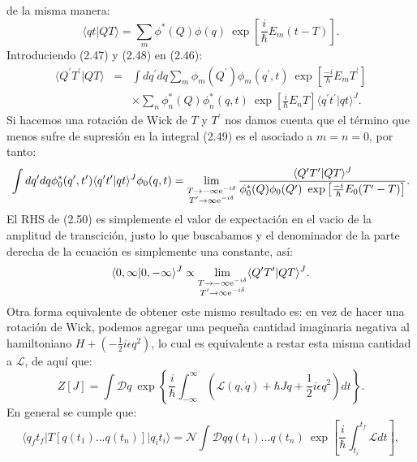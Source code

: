 de la misma manera:
\begin{equation}
\langle qt|	QT  \rangle=\sum_{m}\phi^{*}(Q)\phi(q)\ \exp\left[\frac{i}{\hbar}E_{m}(t-T)\right].
\end{equation}
Introduciendo (2.47) y (2.48) en (2.46):
\begin{eqnarray}
\nonumber \langle Q^{\prime} T^{\prime}|QT\rangle &=&\int dq^{\prime} dq\sum_{m}\phi_{m}(Q^{\prime})\phi_{m}(q^{\prime},t)\ \exp\left[\frac{-i}{\hbar}E_{m}T^{\prime}\right]\\
&&\times  \sum_{n}\phi_{n}^{*}(Q)\phi_{n}^{*}(q,t)\ \exp\left[\frac{i}{\hbar}E_{n}T\right]\langle q^{\prime} t^{\prime}|qt\rangle^{J}.
\end{eqnarray}
Si hacemos una rotación de Wick de $T$ y $T^{\prime} $ nos damos cuenta que el término que menos sufre de supresión en la integral (2.49) es el asociado a $m=n=0$, por tanto:
\begin{equation}
\int dq^{\prime} dq\phi_{0}^{*}(q^{\prime},t^{\prime})\langle q^{\prime} t^{\prime}|qt\rangle^{J}\phi_{0}(q,t)=\lim_{\substack{T\to-\text{\ensuremath{\infty}e}^{-i\delta}\\T^{\prime}\to\text{\ensuremath{\infty}e}^{-i\delta}}}\frac{\langle Q^{\prime} T^{\prime}|QT\rangle^{J}}{\phi_{0}^{*}(Q)\phi_{0}(Q^{\prime})\ \exp\left[\frac{-i}{\hbar}E_{0}(T^{\prime}-T)\right]}.
\end{equation}
El RHS de (2.50) es simplemente el valor de expectación en el vacio de la amplitud de transcición, justo lo que buscabamos y el denominador de la parte derecha de la ecuación es simplemente una constante, así:
\begin{equation}
\langle 0,\infty| 0,-\infty \rangle ^J \propto \lim_{\substack{T\to-\text{\ensuremath{\infty}e}^{-i\delta}\\T^{\prime}\to\text{\ensuremath{\infty}e}^{-i\delta}}} \langle Q^{\prime} T^{\prime}|QT\rangle^{J}.
\end{equation}
Otra forma equivalente de obtener este mismo resultado es: en vez de hacer una rotación de Wick, podemos agregar una pequeña cantidad imaginaria negativa al hamiltoniano $H+(-\frac{1}{2}i\epsilon q^2)$, lo cual es equivalente a restar esta misma cantidad a $\mathcal{L}$, de aquí que:
\begin{equation}
Z[J]=\int\mathcal{D}q\ \exp\left\{ \frac{i}{\hbar}\int_{-\infty}^{\infty}(\mathcal{L}(q,\dot{q})+\hbar Jq + \frac{1}{2}i\epsilon q^2)dt\right\} .
\end{equation}
En general se cumple que:
\begin{equation}
 \langle q_{f}t_{f}|T[q(t_{1})...q(t_{n})]|q_{i}t_{i}\rangle=\mathcal{N}\int\mathcal{D}qq(t_{1})...q(t_{n})\ \exp\left[\frac{i}{\hbar}\int_{t_{i}}^{t_{f}}\mathcal{L}dt\right],
\end{equation}
